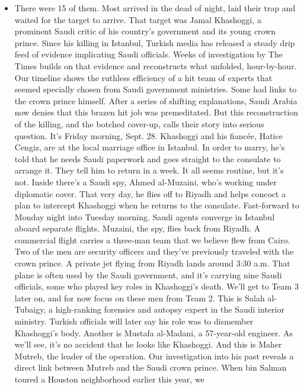\begin{itemize}
\tightlist
\item
  There were 15 of them. Most arrived in the dead of night, laid their
  trap and waited for the target to arrive. That target was Jamal
  Khashoggi, a prominent Saudi critic of his country's government and
  its young crown prince. Since his killing in Istanbul, Turkish media
  has released a steady drip feed of evidence implicating Saudi
  officials. Weeks of investigation by The Times builds on that evidence
  and reconstructs what unfolded, hour-by-hour. Our timeline shows the
  ruthless efficiency of a hit team of experts that seemed specially
  chosen from Saudi government ministries. Some had links to the crown
  prince himself. After a series of shifting explanations, Saudi Arabia
  now denies that this brazen hit job was premeditated. But this
  reconstruction of the killing, and the botched cover-up, calls their
  story into serious question. It's Friday morning, Sept. 28. Khashoggi
  and his fiancée, Hatice Cengiz, are at the local marriage office in
  Istanbul. In order to marry, he's told that he needs Saudi paperwork
  and goes straight to the consulate to arrange it. They tell him to
  return in a week. It all seems routine, but it's not. Inside there's a
  Saudi spy, Ahmed al-Muzaini, who's working under diplomatic cover.
  That very day, he flies off to Riyadh and helps concoct a plan to
  intercept Khashoggi when he returns to the consulate. Fast-forward to
  Monday night into Tuesday morning. Saudi agents converge in Istanbul
  aboard separate flights. Muzaini, the spy, flies back from Riyadh. A
  commercial flight carries a three-man team that we believe flew from
  Cairo. Two of the men are security officers and they've previously
  traveled with the crown prince. A private jet flying from Riyadh lands
  around 3:30 a.m. That plane is often used by the Saudi government, and
  it's carrying nine Saudi officials, some who played key roles in
  Khashoggi's death. We'll get to Team 3 later on, and for now focus on
  these men from Team 2. This is Salah al-Tubaigy, a high-ranking
  forensics and autopsy expert in the Saudi interior ministry. Turkish
  officials will later say his role was to dismember Khashoggi's body.
  Another is Mustafa al-Madani, a 57-year-old engineer. As we'll see,
  it's no accident that he looks like Khashoggi. And this is Maher
  Mutreb, the leader of the operation. Our investigation into his past
  reveals a direct link between Mutreb and the Saudi crown prince. When
  bin Salman toured a Houston neighborhood earlier this year, we

\end{itemize}
